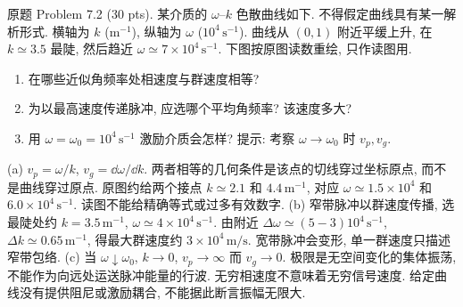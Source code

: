 \begin{exercise}\label{ps:7.2}
原题 Problem 7.2 (30 pts). 某介质的 $\omega$--$k$ 色散曲线如下. 不得假定曲线具有某一解析形式. 横轴为 $k$ ($\mathrm{m^{-1}}$), 纵轴为 $\omega$ ($10^4\,\mathrm{s^{-1}}$). 曲线从 $(0,1)$ 附近平缓上升, 在 $k\simeq3.5$ 最陡, 然后趋近 $\omega\simeq7\times10^4\,\mathrm{s^{-1}}$. 下图按原图读数重绘, 只作读图用.
\begin{center}\end{center}
\begin{enumerate}[label=\alph*.]
\item 在哪些近似角频率处相速度与群速度相等?
\item 为以最高速度传递脉冲, 应选哪个平均角频率? 该速度多大?
\item 用 $\omega=\omega_0=10^4\,\mathrm{s^{-1}}$ 激励介质会怎样? 提示: 考察 $\omega\to\omega_0$ 时 $v_p,v_g$.
\end{enumerate}
\end{exercise}
\begin{solution}
(a) $v_p=\omega/k$, $v_g=\dd\omega/\dd k$. 两者相等的几何条件是该点的切线穿过坐标原点, 而不是曲线穿过原点. 原图约给两个接点 $k\simeq2.1$ 和 $4.4\,\mathrm{m^{-1}}$, 对应 $\omega\simeq1.5\times10^4$ 和 $6.0\times10^4\,\mathrm{s^{-1}}$. 读图不能给精确等式或过多有效数字.
(b) 窄带脉冲以群速度传播, 选最陡处约 $k=3.5\,\mathrm{m^{-1}}$, $\omega\simeq4\times10^4\,\mathrm{s^{-1}}$. 由附近 $\Delta\omega\simeq(5-3)10^4\,\mathrm{s^{-1}}$, $\Delta k\simeq0.65\,\mathrm{m^{-1}}$, 得最大群速度约 $3\times10^4\,\mathrm{m/s}$. 宽带脉冲会变形, 单一群速度只描述窄带包络.
(c) 当 $\omega\downarrow\omega_0$, $k\to0$, $v_p\to\infty$ 而 $v_g\to0$. 极限是无空间变化的集体振荡, 不能作为向远处运送脉冲能量的行波. 无穷相速度不意味着无穷信号速度. 给定曲线没有提供阻尼或激励耦合, 不能据此断言振幅无限大.
\end{solution}

